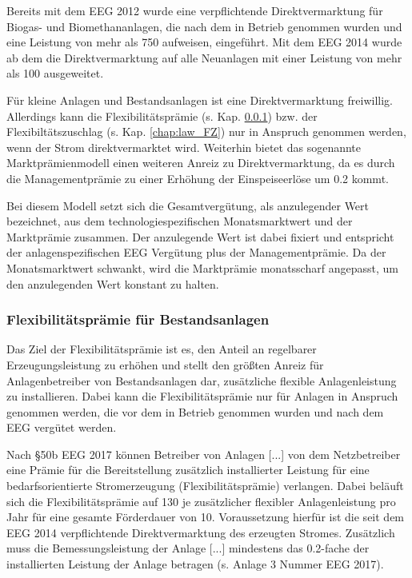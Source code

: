Bereits mit dem \gls{EEG} \SI{2012}{\relax} wurde eine verpflichtende Direktvermarktung für Biogas- und Biomethananlagen, die nach dem  in Betrieb genommen wurden und eine Leistung von mehr als \SI{750}{\kw} aufweisen, eingeführt. Mit dem \gls{EEG} \SI{2014}{\relax} wurde ab dem  die Direktvermarktung auf alle Neuanlagen mit einer Leistung von mehr als \SI{100}{\kw} ausgeweitet.\smallskip

Für kleine Anlagen und Bestandsanlagen ist eine Direktvermarktung freiwillig. Allerdings kann die Flexibilitätsprämie (s. Kap. \ref{chap:law_FP}) bzw. der Flexibiltätszuschlag (s. Kap. \ref{chap:law_FZ}) nur in Anspruch genommen werden, wenn der Strom direktvermarktet wird. Weiterhin bietet das sogenannte Marktprämienmodell einen weiteren Anreiz zu Direktvermarktung, da es durch die Managementprämie zu einer Erhöhung der Einspeiseerlöse um \SI[per-mode=symbol]{0.2}{\ctkwh} kommt.\smallskip

Bei diesem Modell setzt sich die Gesamtvergütung, als anzulegender Wert bezeichnet, aus dem technologiespezifischen Monatsmarktwert und der Marktprämie zusammen. Der anzulegende Wert ist dabei fixiert und entspricht der anlagenspezifischen \gls{EEG} Vergütung plus der Managementprämie. Da der Monatsmarktwert schwankt, wird die Marktprämie monatsscharf angepasst, um den anzulegenden Wert konstant zu halten. \parencite{NKGH-DV}


\subsubsection{Flexibilitätsprämie für Bestandsanlagen}\label{chap:law_FP}

Das Ziel der Flexibilitätsprämie ist es, den Anteil an regelbarer Erzeugungsleistung zu erhöhen und stellt den größten Anreiz für Anlagenbetreiber von Bestandsanlagen dar, zusätzliche flexible Anlagenleistung zu installieren. Dabei kann die Flexibilitätsprämie nur für Anlagen in Anspruch genommen werden, die vor dem  in Betrieb genommen wurden und nach dem \gls{EEG} vergütet werden.\smallskip

Nach \S 50b \gls{EEG} \SI{2017}{\relax} können \glqq Betreiber von Anlagen [...] von dem Netzbetreiber eine Prämie für die Bereitstellung zusätzlich installierter Leistung für eine bedarfsorientierte Stromerzeugung (Flexibilitätsprämie) verlangen.\grqq{} Dabei beläuft sich die Flexibilitätsprämie auf \SI{130}{\sieuro} je \si{\kw} zusätzlicher flexibler Anlagenleistung pro Jahr für eine gesamte Förderdauer von \SI{10}{\Jahren}. Voraussetzung hierfür ist die seit dem \gls{EEG} \SI{2014}{\relax} verpflichtende Direktvermarktung des erzeugten Stromes. Zusätzlich muss \glqq{}die Bemessungsleistung der Anlage [...] mindestens das \SI{0.2}{\relax}-fache der installierten Leistung der Anlage\grqq{} betragen (s. Anlage 3 Nummer  \gls{EEG} \SI{2017}{\relax}). \parencite{BJV2014} \parencite{DanielGromke2019}\smallskip

